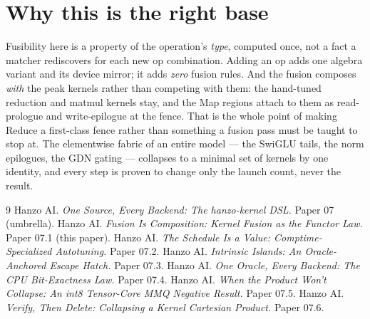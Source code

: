 \documentclass[11pt]{article}
\begin{document}
\section{Why this is the right base}

Fusibility here is a property of the operation's \emph{type}, computed once, not a fact a matcher
rediscovers for each new op combination. Adding an op adds one algebra variant and its device mirror; it
adds \emph{zero} fusion rules. And the fusion composes \emph{with} the peak kernels rather than competing
with them: the hand-tuned reduction and matmul kernels stay, and the Map regions attach to them as
read-prologue and write-epilogue at the fence. That is the whole point of making Reduce a first-class
fence rather than something a fusion pass must be taught to stop at. The elementwise fabric of an entire
model --- the SwiGLU tails, the norm epilogues, the GDN gating --- collapses to a minimal set of kernels
by one identity, and every step is proven to change only the launch count, never the result.

\begin{thebibliography}{9}
\small
{} Hanzo AI. \emph{One Source, Every Backend: The hanzo-kernel DSL.} Paper 07 (umbrella).
 Hanzo AI. \emph{Fusion Is Composition: Kernel Fusion as the Functor Law.} Paper 07.1 (this paper).
 Hanzo AI. \emph{The Schedule Is a Value: Comptime-Specialized Autotuning.} Paper 07.2.
 Hanzo AI. \emph{Intrinsic Islands: An Oracle-Anchored Escape Hatch.} Paper 07.3.
 Hanzo AI. \emph{One Oracle, Every Backend: The CPU Bit-Exactness Law.} Paper 07.4.
 Hanzo AI. \emph{When the Product Won't Collapse: An int8 Tensor-Core MMQ Negative Result.} Paper 07.5.
 Hanzo AI. \emph{Verify, Then Delete: Collapsing a Kernel Cartesian Product.} Paper 07.6.
\end{thebibliography}
\end{document}
